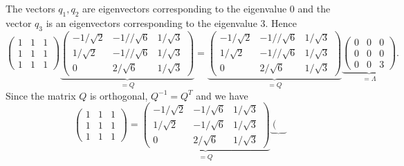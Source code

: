 \documentclass{article}
\begin{document}
\begin{example}
    The vectors $q_1, q_2$ are eigenvectors corresponding to the eigenvalue 0 and the vector $q_3$
    is an eigenvectors corresponding to the eigenvalue 3.
    Hence
     \[
        \left( \begin{array}{rrr}
                  1   &  1 &    1\\
                   1   &  1 &    1\\
                   1  &   1 &    1
          \end{array} \right)
          \underbrace{ \left( \begin{array}{rrr}
                    -1/ \sqrt{2} & -1// \sqrt{6} & 1/\sqrt{3} \\
                   1/ \sqrt{2} & -1// \sqrt{6} & 1/ \sqrt{3} \\
                   0 & 2/ \sqrt{6} & 1/\sqrt{3}
          \end{array} \right) }_{=Q}
    =    \underbrace{ \left( \begin{array}{rrr}
                    -1/ \sqrt{2} & -1// \sqrt{6} & 1/\sqrt{3} \\
                   1/ \sqrt{2} & -1// \sqrt{6} & 1/ \sqrt{3} \\
                   0 & 2/ \sqrt{6} & 1/\sqrt{3}
          \end{array} \right) }_{=Q}
            \underbrace{ \left( \begin{array}{rrr}
                   0   &  0 &    0\\
                   0   &  0 &    0\\
                   0  &   0 &    3
           \end{array} \right) }_{=\Lambda}.
     \]
     Since the matrix $Q$ is orthogonal, $Q^{-1}=Q^T$ and we have
      \[
        \left( \begin{array}{rrr}
                  1   &  1 &    1\\
                   1   &  1 &    1\\
                   1  &   1 &    1
          \end{array} \right)
    =    \underbrace{ \left( \begin{array}{rrr}
                    -1/ \sqrt{2} & -1/ \sqrt{6} & 1/\sqrt{3} \\
                   1/ \sqrt{2} & -1/ \sqrt{6} & 1/ \sqrt{3} \\
                   0 & 2/ \sqrt{6} & 1/\sqrt{3}
          \end{array} \right) }_{=Q}
            \underbrace{ \left( \begin{array}{rrr}

\end{array}}\]
\end{example}
\end{document}
